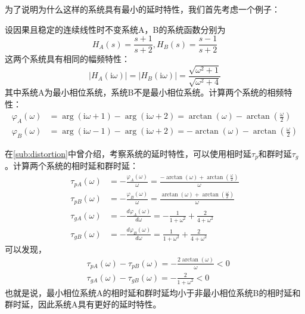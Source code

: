 \documentclass{ctexbook}
\begin{document}
为了说明为什么这样的系统具有最小的延时特性，我们首先考虑一个例子：
\begin{example}
    设因果且稳定的连续线性时不变系统A，B的系统函数分别为
    \[H_A(s)=\frac{s+1}{s+2},H_B(s)=\frac{s-1}{s+2}\]
    这两个系统具有相同的幅频特性：
    \[|H_A(\mathrm{i}\omega)|=|H_B(\mathrm{i}\omega)|=\frac{\sqrt{\omega^2+1}}{\sqrt{\omega^2+4}}\]
    其中系统A为最小相位系统，系统B不是最小相位系统。计算两个系统的相频特性：
    \begin{align*}
        \varphi_A(\omega)&=\arg(\mathrm{i}\omega+1)-\arg(\mathrm{i}\omega+2)=\arctan(\omega)-\arctan\left(\frac{\omega}{2}\right)\\
        \varphi_B(\omega)&=\arg(\mathrm{i}\omega-1)-\arg(\mathrm{i}\omega+2)=-\arctan(\omega)-\arctan\left(\frac{\omega}{2}\right)
    \end{align*}

    在\ref{sub:distortion}中曾介绍，考察系统的延时特性，可以使用相时延$\tau_p$和群时延$\tau_g$。计算两个系统的相时延和群时延：
    \begin{align*}
        \tau_{pA}(\omega)&=-\frac{\varphi_A(\omega)}{\omega}=\frac{-\arctan(\omega)+\arctan\left(\frac{\omega}{2}\right)}{\omega}\\
        \tau_{pB}(\omega)&=-\frac{\varphi_B(\omega)}{\omega}=\frac{\arctan(\omega)+\arctan\left(\frac{\omega}{2}\right)}{\omega}\\
        \tau_{gA}(\omega)&=-\frac{d\varphi_A(\omega)}{d\omega}=-\frac{1}{1+\omega^2}+\frac{2}{4+\omega^2}\\
        \tau_{gB}(\omega)&=-\frac{d\varphi_B(\omega)}{d\omega}=\frac{1}{1+\omega^2}+\frac{2}{4+\omega^2}
    \end{align*}
    可以发现，
    \begin{align*}
        &\tau_{pA}(\omega)-\tau_{pB}(\omega)=-\frac{2\arctan(\omega)}{\omega}<0\\
        &\tau_{gA}(\omega)-\tau_{gB}(\omega)=-\frac{2}{1+\omega^2}<0
    \end{align*}
    也就是说，最小相位系统A的相时延和群时延均小于非最小相位系统B的相时延和群时延，因此系统A具有更好的延时特性。
\end{example}
\end{document}

